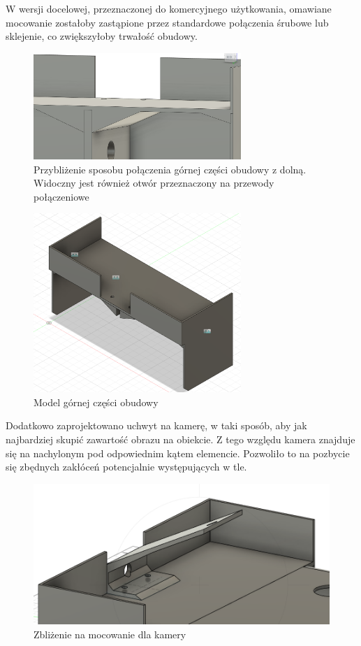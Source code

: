 W wersji docelowej, przeznaczonej do komercyjnego użytkowania, omawiane mocowanie zostałoby zastąpione przez standardowe połączenia śrubowe lub sklejenie, co zwiększyłoby trwałość obudowy.

\begin{figure}[H]
  \centering
  \includegraphics[width=0.7\textwidth]{./graf/full-close.png}
  \caption{Przybliżenie sposobu połączenia górnej części obudowy z dolną. Widoczny jest również otwór przeznaczony na przewody połączeniowe}
  \label{fig:full-close}
\end{figure}

\begin{figure}[H]
  \centering
  \includegraphics[width=0.7\textwidth]{./graf/upper.png}
  \caption{Model górnej części obudowy}
  \label{fig:upper}
\end{figure}

Dodatkowo zaprojektowano uchwyt na kamerę, w taki sposób, aby jak najbardziej skupić zawartość obrazu na obiekcie. Z tego względu kamera znajduje się na nachylonym pod odpowiednim kątem elemencie. Pozwoliło to na pozbycie się zbędnych zakłóceń potencjalnie występujących w tle. 

\begin{figure}[H]
  \centering
  \includegraphics[width=1.0\textwidth]{./graf/kamera-base.png}
  \caption{Zbliżenie na mocowanie dla kamery}
  \label{fig:full}
\end{figure}


